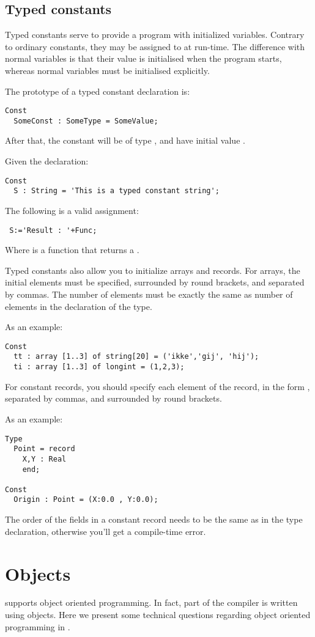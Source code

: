 \documentclass{report}
\begin{document}
\subsection{Typed constants}
Typed constants serve to provide a program with initialized variables.
Contrary to ordinary constants, they may be assigned to at run-time.
The difference with normal variables is that their value is initialised
when the program starts, whereas normal variables must be initialised
explicitly.

The prototype of a typed constant declaration is:
\begin{verbatim}
Const
  SomeConst : SomeType = SomeValue;
\end{verbatim}
After that, the constant  will be of type , and
have initial value .

Given the declaration:
\begin{verbatim}
Const
  S : String = 'This is a typed constant string';
\end{verbatim}
The following is a valid assignment:
\begin{verbatim}
 S:='Result : '+Func;
\end{verbatim}
Where  is a function that returns a .

Typed constants also allow you to initialize arrays and records. For arrays,
the initial elements must be specified, surrounded by round brackets, and
separated by commas. The number of elements must be exactly the same as
number of elements in the declaration of the type. 

As an example:
\begin{verbatim}
Const 
  tt : array [1..3] of string[20] = ('ikke','gij', 'hij');
  ti : array [1..3] of longint = (1,2,3);
\end{verbatim}

For constant records, you should specify each element of the record, in the
form , separated by commas, and surrounded by round
brackets.

As an example:
\begin{verbatim}
Type 
  Point = record
    X,Y : Real
    end;

Const
  Origin : Point = (X:0.0 , Y:0.0); 
\end{verbatim}
The order of the fields in a constant record needs to be the same as in the type declaration,
otherwise you'll get a compile-time error.

\section{Objects}
\fpc supports object oriented programming. In fact, part of the compiler is
written using objects. Here we present some technical questions regarding
object oriented programming in \fpc.
\end{document}
